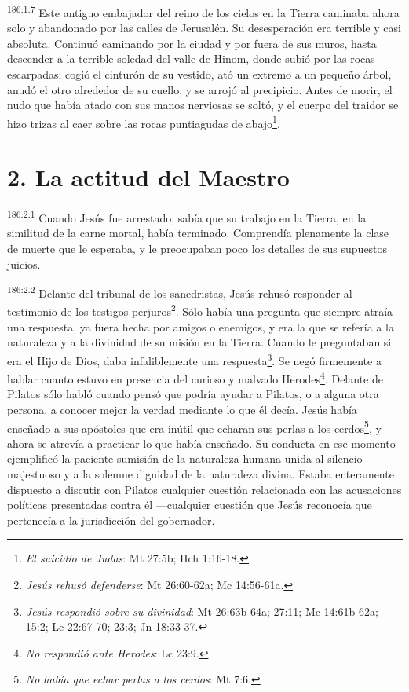 \par 
\textsuperscript{186:1.7} Este antiguo embajador del reino de los cielos en la Tierra caminaba ahora solo y abandonado por las calles de Jerusalén. Su desesperación era terrible y casi absoluta. Continuó caminando por la ciudad y por fuera de sus muros, hasta descender a la terrible soledad del valle de Hinom, donde subió por las rocas escarpadas; cogió el cinturón de su vestido, ató un extremo a un pequeño árbol, anudó el otro alrededor de su cuello, y se arrojó al precipicio. Antes de morir, el nudo que había atado con sus manos nerviosas se soltó, y el cuerpo del traidor se hizo trizas al caer sobre las rocas puntiagudas de abajo\footnote{\textit{El suicidio de Judas}: Mt 27:5b; Hch 1:16-18.}.

\section*{2. La actitud del Maestro}
\par 
\textsuperscript{186:2.1} Cuando Jesús fue arrestado, sabía que su trabajo en la Tierra, en la similitud de la carne mortal, había terminado. Comprendía plenamente la clase de muerte que le esperaba, y le preocupaban poco los detalles de sus supuestos juicios.

\par 
\textsuperscript{186:2.2} Delante del tribunal de los sanedristas, Jesús rehusó responder al testimonio de los testigos perjuros\footnote{\textit{Jesús rehusó defenderse}: Mt 26:60-62a; Mc 14:56-61a.}. Sólo había una pregunta que siempre atraía una respuesta, ya fuera hecha por amigos o enemigos, y era la que se refería a la naturaleza y a la divinidad de su misión en la Tierra. Cuando le preguntaban si era el Hijo de Dios, daba infaliblemente una respuesta\footnote{\textit{Jesús respondió sobre su divinidad}: Mt 26:63b-64a; 27:11; Mc 14:61b-62a; 15:2; Lc 22:67-70; 23:3; Jn 18:33-37.}. Se negó firmemente a hablar cuanto estuvo en presencia del curioso y malvado Herodes\footnote{\textit{No respondió ante Herodes}: Lc 23:9.}. Delante de Pilatos sólo habló cuando pensó que podría ayudar a Pilatos, o a alguna otra persona, a conocer mejor la verdad mediante lo que él decía. Jesús había enseñado a sus apóstoles que era inútil que echaran sus perlas a los cerdos\footnote{\textit{No había que echar perlas a los cerdos}: Mt 7:6.}, y ahora se atrevía a practicar lo que había enseñado. Su conducta en ese momento ejemplificó la paciente sumisión de la naturaleza humana unida al silencio majestuoso y a la solemne dignidad de la naturaleza divina. Estaba enteramente dispuesto a discutir con Pilatos cualquier cuestión relacionada con las acusaciones políticas presentadas contra él ---cualquier cuestión que Jesús reconocía que pertenecía a la jurisdicción del gobernador.

